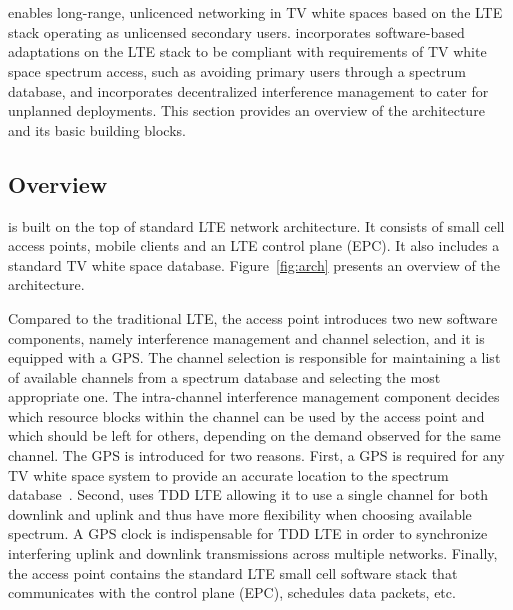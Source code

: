 \section{\cf}


\cf enables long-range, unlicenced networking in TV white spaces 
based on the LTE stack operating as unlicensed secondary users. \cf incorporates software-based adaptations on the LTE stack to be compliant with
 requirements of TV white space spectrum access, such as avoiding primary users through a spectrum database, and incorporates decentralized interference management to cater for unplanned deployments. 
This section provides an overview of the \cf architecture and its basic building blocks. 



\subsection{Overview}

\cf is built on the top of standard LTE network architecture. It consists of small cell access points, mobile clients and an LTE control plane (EPC). It also includes a standard TV white space database. Figure~\ref{fig:arch} presents an overview of the \cf architecture.

Compared to the traditional LTE, the \cf access point introduces two new software components, namely interference management and channel selection, and it is equipped with a GPS.
The channel selection is responsible for maintaining a list of available channels from a spectrum database and selecting the most appropriate one. 
The intra-channel interference management component decides which resource blocks within the channel can be used by the access point and which should be left for others, 
depending on the demand observed for the same channel. The GPS is introduced for two reasons. First, a GPS is required for any TV white space system to provide an accurate location to the spectrum database~\cite{Rice_af}. 
Second, \cf uses TDD LTE allowing it to use a single channel for both downlink and uplink and thus have more flexibility when choosing available spectrum. A GPS clock is indispensable for TDD LTE in order to synchronize interfering uplink and downlink transmissions across multiple networks. Finally, the access point contains the standard LTE small cell software stack that communicates with the control plane (EPC), 
schedules data packets, etc. 


